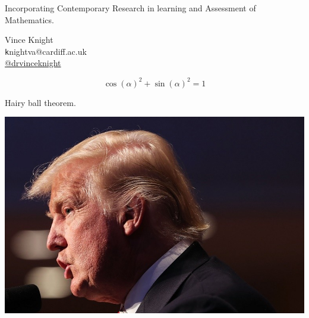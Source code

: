 \documentclass{beamer}
\begin{document}
    \begin{frame}
        \begin{center}
            \Large

            Incorporating Contemporary Research in learning and Assessment of
            Mathematics.\\

            \vspace{1cm}

            \normalsize
            Vince Knight\\
            \texttt knightva@cardiff.ac.uk\\
            \href{https://twitter.com/drvinceknight}{@drvinceknight}
        \end{center}


    \end{frame}

    \begin{frame}
        $$\cos(\alpha)^2 + \sin(\alpha)^2=1$$

        \begin{center}
        \end{center}
	\end{frame}


    \begin{frame}
        \begin{center}
            \Large Hairy ball theorem.

            \pause
            \includegraphics[width=.8\textwidth]{static/haircut.jpg}
        \end{center}
    \end{frame}
\end{document}
